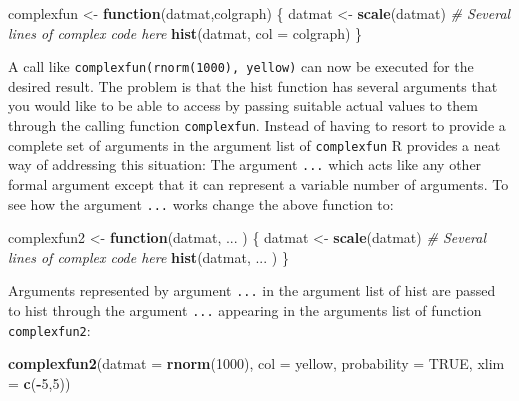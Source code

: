 \documentclass[
]{book}
\newenvironment{Shaded}{\begin{snugshade}}{\end{snugshade}}
\newcommand{\AttributeTok}[1]{\textcolor[rgb]{0.13,0.29,0.53}{#1}}
\newcommand{\CommentTok}[1]{\textcolor[rgb]{0.56,0.35,0.01}{\textit{#1}}}
\newcommand{\ConstantTok}[1]{\textcolor[rgb]{0.56,0.35,0.01}{#1}}
\newcommand{\ControlFlowTok}[1]{\textcolor[rgb]{0.13,0.29,0.53}{\textbf{#1}}}
\newcommand{\DecValTok}[1]{\textcolor[rgb]{0.00,0.00,0.81}{#1}}
\newcommand{\FunctionTok}[1]{\textcolor[rgb]{0.13,0.29,0.53}{\textbf{#1}}}
\newcommand{\NormalTok}[1]{#1}
\newcommand{\OtherTok}[1]{\textcolor[rgb]{0.56,0.35,0.01}{#1}}
\newcommand{\SpecialCharTok}[1]{\textcolor[rgb]{0.81,0.36,0.00}{\textbf{#1}}}
\newcommand{\StringTok}[1]{\textcolor[rgb]{0.31,0.60,0.02}{#1}}
\begin{document}
\begin{Shaded}
\begin{Highlighting}[]
\NormalTok{complexfun }\OtherTok{\textless{}{-}} \ControlFlowTok{function}\NormalTok{(datmat,colgraph)}
\NormalTok{    \{ datmat }\OtherTok{\textless{}{-}} \FunctionTok{scale}\NormalTok{(datmat) }
       \CommentTok{\# Several lines of complex code here }
      \FunctionTok{hist}\NormalTok{(datmat, }\AttributeTok{col =}\NormalTok{ colgraph)              \}}
\end{Highlighting}
\end{Shaded}

A call like \texttt{complexfun(rnorm(1000),\ \textquotesingle{}yellow\textquotesingle{})} can now be executed for the desired result. The problem is that the hist function has several arguments that you would like to be able to access by passing suitable actual values to them through the calling function \texttt{complexfun}. Instead of having to resort to provide a complete set of arguments in the argument list of \texttt{complexfun} R provides a neat way of addressing this situation: The argument \texttt{...} which acts like any other formal argument except that it can represent a variable number of arguments. To see how the argument \texttt{...} works change the above function to:

\begin{Shaded}
\begin{Highlighting}[]
\NormalTok{complexfun2 }\OtherTok{\textless{}{-}} \ControlFlowTok{function}\NormalTok{(datmat, ... )}
\NormalTok{ \{ datmat }\OtherTok{\textless{}{-}} \FunctionTok{scale}\NormalTok{(datmat) }
       \CommentTok{\# Several lines of complex code here }
   \FunctionTok{hist}\NormalTok{(datmat, ... )    \}}
\end{Highlighting}
\end{Shaded}

Arguments represented by argument \texttt{...} in the argument list of hist are passed to hist through the argument \texttt{...} appearing in the arguments list of function \texttt{complexfun2}:

\begin{Shaded}
\begin{Highlighting}[]
\FunctionTok{complexfun2}\NormalTok{(}\AttributeTok{datmat =} \FunctionTok{rnorm}\NormalTok{(}\DecValTok{1000}\NormalTok{), }\AttributeTok{col =} \StringTok{\textquotesingle{}yellow\textquotesingle{}}\NormalTok{, }
        \AttributeTok{probability =} \ConstantTok{TRUE}\NormalTok{, }\AttributeTok{xlim =} \FunctionTok{c}\NormalTok{(}\SpecialCharTok{{-}}\DecValTok{5}\NormalTok{,}\DecValTok{5}\NormalTok{))}
\end{Highlighting}
\end{Shaded}
\end{document}
